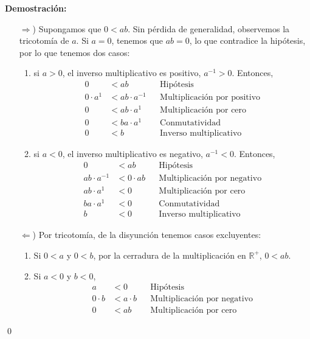 \documentclass[11pt]{article}
\newcommand{\R}{\mathbb{R}}
\begin{document}
\begin{enumerate}[label=\alph*)]
    \textbf{Demostración:}
    \begin{itemize}
        \item[$\Rightarrow$)] Supongamos que $0<ab$. Sin pérdida de generalidad, observemos la tricotomía de $a$. Si $a=0$, tenemos que $ab=0$, lo que contradice la hipótesis, por lo que tenemos dos casos:
        \begin{enumerate}[label=\roman*)]
            \item si $a>0$, el inverso multiplicativo es positivo, $a^{-1}>0$. Entonces, \begin{align*}
                0 &< ab && \text{Hipótesis}\\
                0 \cdot a^{1} &< ab \cdot a^{-1} && \text{Multiplicación por positivo}\\
                0 &< ab \cdot a^{1} && \text{Multiplicación por cero}\\
                0 &< ba \cdot a^{1} && \text{Conmutatividad}\\
                0 &< b && \text{Inverso multiplicativo}
            \end{align*}
            \item si $a<0$, el inverso multiplicativo es negativo, $a^{-1}<0$. Entonces, \begin{align*}
                0 &< ab && \text{Hipótesis}\\
                ab \cdot a^{-1} &< 0 \cdot ab && \text{Multiplicación por negativo}\\
                ab \cdot a^{1} &< 0&& \text{Multiplicación por cero}\\
                ba \cdot a^{1} &< 0&& \text{Conmutatividad}\\
                b &< 0&& \text{Inverso multiplicativo}
            \end{align*}
        \end{enumerate}
        \item[$\Leftarrow$)] Por tricotomía, de la disyunción tenemos casos excluyentes:
        \begin{enumerate}[label=\roman*)]
            \item Si $0<a$ y $0<b$, por la cerradura de la multiplicación en $\R^+$, $0<ab$.
            \item Si $a<0$ y $b<0$, \begin{align*}
                a &< 0 && \text{Hipótesis}\\
                0 \cdot b &< a\cdot b && \text{Multiplicación por negativo}\\
                0 &< ab && \text{Multiplicación por cero}
            \end{align*}
        \end{enumerate}
    \end{itemize} \qed


\end{enumerate}
\end{document}
